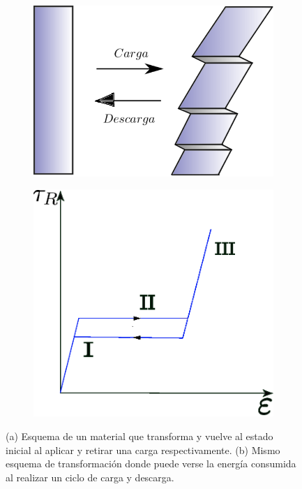 \documentclass[a4paper,12pt,fleqn,twoside,openany]{book}
\begin{document}
 
 \begin{figure}[h]
 \centering
    \begin{subfigure}{0.49\textwidth}
        \includegraphics[width=\textwidth]{Img/Introduccion/HisteresisEsquema.eps}
        \caption{}
        \label{fig:}
    \end{subfigure}
    \begin{subfigure}{0.45\textwidth}
        \includegraphics[width=\textwidth]{Img/Introduccion/Histeresis.eps}
        \caption{}
        \label{fig:EspA}
    \end{subfigure}
  \caption{(a) Esquema de un material que transforma y vuelve al estado inicial al aplicar y retirar una carga respectivamente. (b)
  Mismo esquema de transformación donde puede verse la energía consumida al realizar un ciclo de carga y descarga.}
  \label{fig:proceso}
  \end{figure}
 
\end{document}

